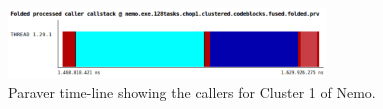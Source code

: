 \begin{figure}
  \centering
  \includegraphics[width=0.75\textwidth]{figures/user-guide/nemo_cluster1_caller_paraver.pdf}
  \caption{Paraver time-line showing the callers for Cluster 1 of Nemo.}
  \label{fig:Nemo_cluster1_callers_paraver}
\end{figure}
